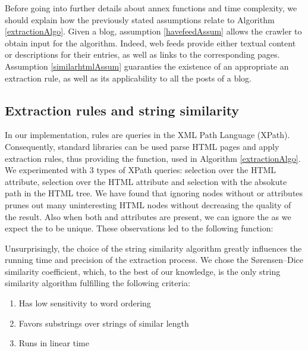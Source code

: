Before going into further details about annex functions and time complexity, we should explain how the previously stated assumptions relate to Algorithm \ref{extractionAlgo}. Given a blog, assumption \ref{havefeedAssum} allows the crawler to obtain input for the algorithm. Indeed, web feeds provide either textual content or descriptions for their entries, as well as links to the corresponding pages. Assumption \ref{similarhtmlAssum} guaranties the existence of an appropriate an extraction rule, as well as its applicability to all the posts of a blog.

\subsection{Extraction rules and string similarity}
In our implementation, rules are queries in the XML Path Language (XPath). Consequently, standard libraries can be used parse HTML pages and apply extraction rules, thus providing the  function, used in Algorithm \ref{extractionAlgo}. We experimented with 3 types of XPath queries: selection over the HTML  attribute, selection over the HTML  attribute and selection with the absokute path in the HTML tree. We have found that ignoring nodes without  or  attributes prunes out many uninteresting HTML nodes without decreasing the quality of the result. Also when both  and  attributes are present, we can ignore the  as we expect the  to be unique. These observations led to the following  function:

\allrulesAlgo

Unsurprisingly, the choice of the string similarity algorithm greatly influences the running time and precision of the extraction process. We chose the Sørensen–Dice similarity coefficient\cite{dice1945}, which, to the best of our knowledge, is the only string similarity algorithm fulfilling the following criteria:

\begin{enumerate}
  \item\label{wordorderProp} Has low sensitivity to word ordering
  \item\label{substringProp} Favors substrings over strings of similar length
  \item\label{linearProp} Runs in linear time
\end{enumerate}


